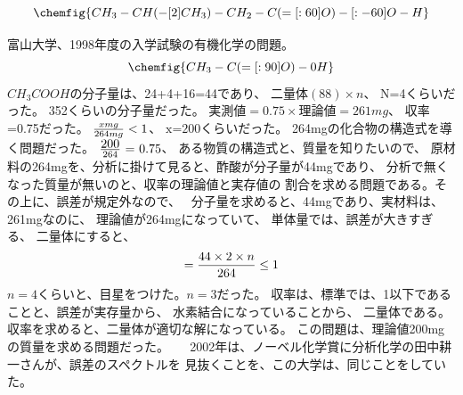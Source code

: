\documentclass{jsarticle}
\begin{document}
\title{}
\author{}
\date{}
\maketitle
 $$  \chemfig{CH_3-CH(-[2]CH_3)-CH_2-C(=[:60]O)-[:-60]O-H} $$ 

 富山大学、1998年度の入学試験の有機化学の問題。
	$$ \chemfig{CH_3-C(=[:90]O)-0H} $$
	$CH_3 COOH$の分子量は、24+4+16=44であり、
	$\text{$二量体(88)\times n$}$、 N=4くらいだった。
	352くらいの分子量だった。
	$\text{$実測値=0.75\times 理論値=261mg$}$、
	収率=0.75だった。
	$\text{${xmg \over 264mg} < 1$}$、
	$\text{x=200}$くらいだった。
	264mgの化合物の構造式を導く問題だった。
	$\text{{$200 \over 264$} = 0.75}$、
	ある物質の構造式と、質量を知りたいので、
	原材料の264mgを、分析に掛けて見ると、酢酸が分子量が44mgであり、
	分析で無くなった質量が無いのと、収率の理論値と実存値の
	割合を求める問題である。その上に、誤差が規定外なので、　
	分子量を求めると、44mgであり、実材料は、261mgなのに、
	理論値が264mgになっていて、
	単体量では、誤差が大きすぎる、
	二量体にすると、
	$$ = {{44 \times 2 \times n} \over {264}} \le 1 $$
	$n = 4$くらいと、目星をつけた。$n=3$だった。
        収率は、標準では、1以下であることと、誤差が実存量から、
	水素結合になっていることから、
	二量体である。　
	収率を求めると、二量体が適切な解になっている。
	この問題は、理論値200mgの質量を求める問題だった。
	　
  2002年は、ノーベル化学賞に分析化学の田中耕一さんが、誤差のスペクトルを
	見抜くことを、この大学は、同じことをしていた。
\end{document}
